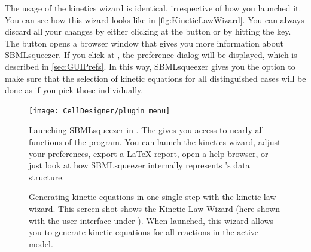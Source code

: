 The usage of the kinetics wizard is identical, irrespective of how you launched it.
You can see how this wizard looks like in \vref{fig:KineticLawWizard}.
You can always discard all your changes by either clicking at the  button or by hitting the \keys{\escwin} key.
The  button opens a browser window that gives you more information about SBMLsqueezer.
If you click at , the preference dialog will be displayed, which is described in \vref{sec:GUIPrefs}.
In this way, SBMLsqueezer gives you the option to make sure that the selection of kinetic equations for all distinguished cases will be done as if you pick those individually.
\begin{figure}
\texttt{[image: CellDesigner/plugin\_menu]}
\caption[Launching SBMLsqueezer in \CellDesigner]{Launching SBMLsqueezer in \CellDesigner.
The  gives you access to nearly all functions of the program.
You can launch the kinetics wizard, adjust your preferences, export a \LaTeX{} report, open a help browser, or just look at how SBMLsqueezer internally represents \CellDesigner's data structure.}
\label{fig:PluginMenu}
\end{figure}
\begin{figure}[b!]
\caption[Generating kinetic equations in one single step with the kinetic law wizard]{Generating kinetic equations in one single step with the kinetic law wizard.
This screen-shot shows the Kinetic Law Wizard (here shown with the user interface
under \MacOSX). When launched, this wizard allows you to generate kinetic equations for all reactions in the active model.}
\label{fig:KineticLawWizard}
\end{figure}

